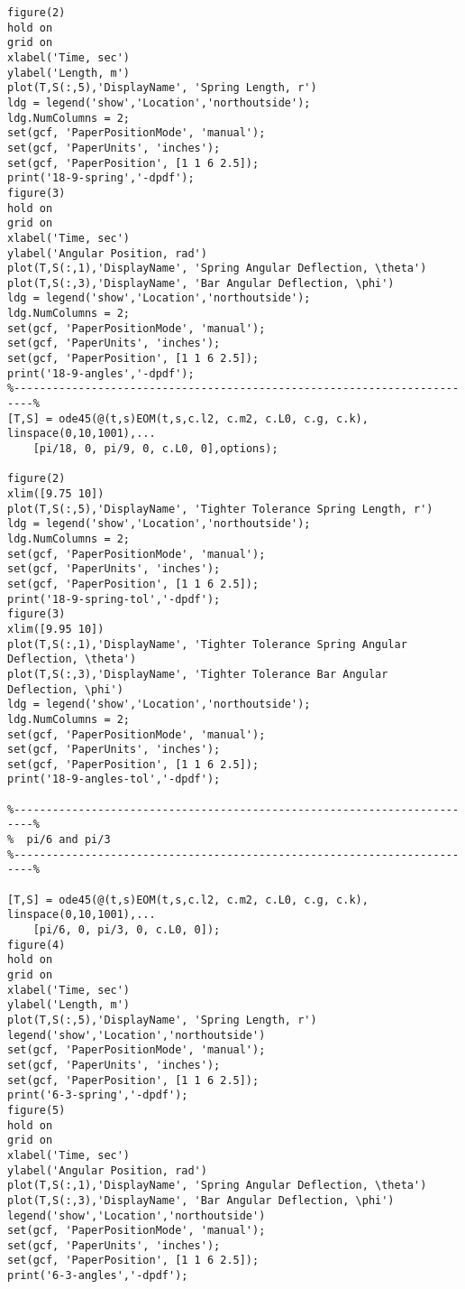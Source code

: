 \begin{lstlisting}[frame=lines,style=Matlab-editor,basicstyle = \mlttfamily]
figure(2)
hold on
grid on
xlabel('Time, sec')
ylabel('Length, m')
plot(T,S(:,5),'DisplayName', 'Spring Length, r')
ldg = legend('show','Location','northoutside');
ldg.NumColumns = 2;
set(gcf, 'PaperPositionMode', 'manual');
set(gcf, 'PaperUnits', 'inches');
set(gcf, 'PaperPosition', [1 1 6 2.5]);
print('18-9-spring','-dpdf');
figure(3)
hold on
grid on
xlabel('Time, sec')
ylabel('Angular Position, rad')
plot(T,S(:,1),'DisplayName', 'Spring Angular Deflection, \theta')
plot(T,S(:,3),'DisplayName', 'Bar Angular Deflection, \phi')
ldg = legend('show','Location','northoutside');
ldg.NumColumns = 2;
set(gcf, 'PaperPositionMode', 'manual');
set(gcf, 'PaperUnits', 'inches');
set(gcf, 'PaperPosition', [1 1 6 2.5]);
print('18-9-angles','-dpdf');
%-------------------------------------------------------------------------%
[T,S] = ode45(@(t,s)EOM(t,s,c.l2, c.m2, c.L0, c.g, c.k), linspace(0,10,1001),...
    [pi/18, 0, pi/9, 0, c.L0, 0],options);

figure(2)
xlim([9.75 10])
plot(T,S(:,5),'DisplayName', 'Tighter Tolerance Spring Length, r')
ldg = legend('show','Location','northoutside');
ldg.NumColumns = 2;
set(gcf, 'PaperPositionMode', 'manual');
set(gcf, 'PaperUnits', 'inches');
set(gcf, 'PaperPosition', [1 1 6 2.5]);
print('18-9-spring-tol','-dpdf');
figure(3)
xlim([9.95 10])
plot(T,S(:,1),'DisplayName', 'Tighter Tolerance Spring Angular Deflection, \theta')
plot(T,S(:,3),'DisplayName', 'Tighter Tolerance Bar Angular Deflection, \phi')
ldg = legend('show','Location','northoutside');
ldg.NumColumns = 2;
set(gcf, 'PaperPositionMode', 'manual');
set(gcf, 'PaperUnits', 'inches');
set(gcf, 'PaperPosition', [1 1 6 2.5]);
print('18-9-angles-tol','-dpdf');

%-------------------------------------------------------------------------%
%  pi/6 and pi/3
%-------------------------------------------------------------------------%

[T,S] = ode45(@(t,s)EOM(t,s,c.l2, c.m2, c.L0, c.g, c.k), linspace(0,10,1001),...
    [pi/6, 0, pi/3, 0, c.L0, 0]);
figure(4)
hold on
grid on
xlabel('Time, sec')
ylabel('Length, m')
plot(T,S(:,5),'DisplayName', 'Spring Length, r')
legend('show','Location','northoutside')
set(gcf, 'PaperPositionMode', 'manual');
set(gcf, 'PaperUnits', 'inches');
set(gcf, 'PaperPosition', [1 1 6 2.5]);
print('6-3-spring','-dpdf');
figure(5)
hold on
grid on
xlabel('Time, sec')
ylabel('Angular Position, rad')
plot(T,S(:,1),'DisplayName', 'Spring Angular Deflection, \theta')
plot(T,S(:,3),'DisplayName', 'Bar Angular Deflection, \phi')
legend('show','Location','northoutside')
set(gcf, 'PaperPositionMode', 'manual');
set(gcf, 'PaperUnits', 'inches');
set(gcf, 'PaperPosition', [1 1 6 2.5]);
print('6-3-angles','-dpdf');


\end{lstlisting}
